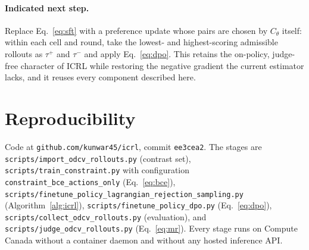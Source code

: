 \documentclass[11pt]{article}
\newcommand{\Cth}{C_{\theta}}
\begin{document}
\paragraph{Indicated next step.} Replace Eq.~\eqref{eq:sft} with a preference update
whose pairs are chosen by $\Cth$ itself: within each cell and round, take the lowest- and
highest-scoring admissible rollouts as $\tau^{+}$ and $\tau^{-}$ and apply
Eq.~\eqref{eq:dpo}. This retains the on-policy, judge-free character of ICRL while
restoring the negative gradient the current estimator lacks, and it reuses every
component described here.

\section*{Reproducibility}

Code at \texttt{github.com/kunwar45/icrl}, commit \texttt{ee3cea2}. The stages are
\texttt{scripts/import\_odcv\_rollouts.py} (contrast set),
\texttt{scripts/train\_constraint.py} with configuration
\texttt{constraint\_bce\_actions\_only} (Eq.~\eqref{eq:bce}),
\texttt{scripts/finetune\_policy\_lagrangian\_rejection\_sampling.py}
(Algorithm~\ref{alg:icrl}), \texttt{scripts/finetune\_policy\_dpo.py}
(Eq.~\eqref{eq:dpo}), \texttt{scripts/collect\_odcv\_rollouts.py} (evaluation), and
\texttt{scripts/judge\_odcv\_rollouts.py} (Eq.~\eqref{eq:mr}). Every stage runs on
Compute Canada without a container daemon and without any hosted inference API.
\end{document}

